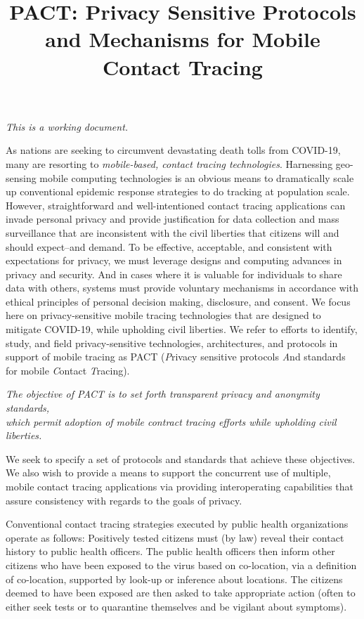 \documentclass{article}
\title{{\Huge PACT\/}:   {\Huge P\/}rivacy Sensitive Protocols and Mechanisms for Mobile {\Huge C\/}ontact {\Huge T\/}racing }
\date{}
\begin{document}
\maketitle

\emph{This is a working document.}

As nations are seeking to circumvent devastating death tolls from COVID-19, many are resorting to \emph{mobile-based, contact tracing technologies}. Harnessing geo-sensing mobile computing technologies
is an obvious means to dramatically scale up conventional epidemic response strategies
to do tracking at population scale. However, straightforward and well-intentioned contact tracing applications can invade personal privacy and provide justification for data collection and mass surveillance that are inconsistent with the civil liberties that citizens will and should expect--and demand. To be effective, acceptable, and consistent with expectations for privacy, we must leverage designs and computing advances in privacy and security. And in cases where it is valuable for individuals to share data with others, systems must provide voluntary mechanisms in accordance with ethical principles of personal decision making, disclosure, and consent. We focus here on privacy-sensitive mobile tracing technologies that are designed to mitigate COVID-19, while upholding civil liberties.  We refer to efforts to identify, study, and field  privacy-sensitive technologies, architectures, and protocols in support of mobile tracing as PACT (\emph{P}rivacy sensitive protocols \emph{A}nd standards for mobile \emph{C}ontact \emph{T}racing).

\begin{center}
\emph{The objective of PACT is to set forth transparent privacy and
  anonymity standards,\\
  which permit adoption of mobile contract tracing efforts while upholding civil liberties.}
\end{center}

We seek to specify a set of protocols and standards that achieve
these objectives. We also wish to provide a means to support the concurrent use of multiple, mobile contact tracing applications via providing interoperating capabilities that assure consistency with regards to the goals of privacy.

Conventional contact tracing strategies executed by public health organizations operate as follows: Positively tested citizens must (by law) reveal their contact history to public health officers. The public health officers then inform other citizens who have been exposed to the virus based on co-location, via a definition of co-location, supported by look-up or inference about locations. The citizens deemed to have been exposed are then asked to take appropriate action (often to either seek tests or to quarantine
themselves and be vigilant about symptoms).  
\end{document}
